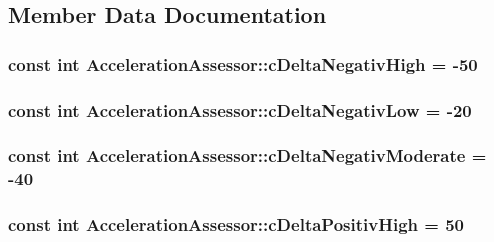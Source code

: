 \subsection{Member Data Documentation}
\hypertarget{class_acceleration_assessor_af4084d41b19e6ff02f97d6c38f18ef0c}{
\subsubsection[{c\+Delta\+Negativ\+High}]{\setlength{\rightskip}{0pt plus 5cm}const int Acceleration\+Assessor\+::c\+Delta\+Negativ\+High = -\/50\hspace{0.3cm}{\ttfamily [private]}}}\label{class_acceleration_assessor_af4084d41b19e6ff02f97d6c38f18ef0c}
\hypertarget{class_acceleration_assessor_a2aa36babea6c7b5c50f1274c368a7453}{
\subsubsection[{c\+Delta\+Negativ\+Low}]{\setlength{\rightskip}{0pt plus 5cm}const int Acceleration\+Assessor\+::c\+Delta\+Negativ\+Low = -\/20\hspace{0.3cm}{\ttfamily [private]}}}\label{class_acceleration_assessor_a2aa36babea6c7b5c50f1274c368a7453}
\hypertarget{class_acceleration_assessor_a055c732fba4149262e248745066add91}{
\subsubsection[{c\+Delta\+Negativ\+Moderate}]{\setlength{\rightskip}{0pt plus 5cm}const int Acceleration\+Assessor\+::c\+Delta\+Negativ\+Moderate = -\/40\hspace{0.3cm}{\ttfamily [private]}}}\label{class_acceleration_assessor_a055c732fba4149262e248745066add91}
\hypertarget{class_acceleration_assessor_adc6aad5920bddf022ae7e8918458728c}{
\subsubsection[{c\+Delta\+Positiv\+High}]{\setlength{\rightskip}{0pt plus 5cm}const int Acceleration\+Assessor\+::c\+Delta\+Positiv\+High = 50\hspace{0.3cm}{\ttfamily [private]}}}\label{class_acceleration_assessor_adc6aad5920bddf022ae7e8918458728c}
